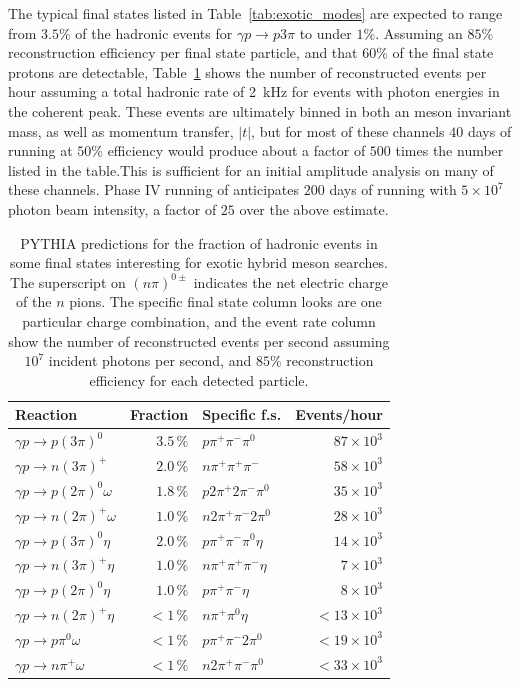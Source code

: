 The typical final states listed in Table~\ref{tab:exotic_modes} are expected to range from $3.5\%$ 
of the hadronic events for $\gamma p \rightarrow p 3\pi$ to under $1\%$. Assuming an $85\%$
reconstruction efficiency per final state particle, and that $60\%$ of the final state protons
are detectable, Table~\ref{tab:decay_rate_fractions} shows the number of reconstructed events per
hour assuming a total hadronic rate of 2~kHz for events with photon energies in the coherent
peak. These events are ultimately binned in both an meson invariant mass, as well as momentum
transfer, $|t|$, but for most of these channels $40$ days of running at $50\%$ efficiency would 
produce about a factor of $500$ times the number listed in the table.This is sufficient for
an initial amplitude analysis on many of these channels. Phase IV running of \GX{} anticipates 
$200$ days of running with $5\times  10^{7}$ photon beam intensity, a factor of $25$ over the
above estimate.

\begin{table}[h!]\centering
\caption[]{\label{tab:decay_rate_fractions}PYTHIA predictions for the fraction of hadronic events
in some final states interesting for exotic hybrid meson searches. The superscript on $(n\pi)^{0\pm}$
indicates the net electric charge of the $n$ pions. The specific final state column looks are one
particular charge combination, and the event rate column show the number of reconstructed events
per second assuming $10^{7}$ incident photons per second, and $85\%$ reconstruction efficiency
for each detected particle.}
\begin{tabular}{|l|r|l|r|}  \hline
Reaction & Fraction & Specific f.s. & Events/hour \\ \hline
$\gamma p \rightarrow p (3\pi)^{0}$ & $3.5\, \%$ & $p\pi^{+}\pi^{-}\pi^{0}$  & $87\times 10^{3}$ \\
$\gamma p \rightarrow n (3\pi)^{+}$ & $2.0\, \%$ & $n\pi^{+}\pi^{+}\pi^{-}$ & $58\times 10^{3}$ \\
$\gamma p \rightarrow p (2\pi)^{0}\omega$ & $1.8\, \%$ & $p2\pi^{+}2\pi^{-}\pi^{0}$ & $35\times 10^{3}$ \\
$\gamma p \rightarrow n (2\pi)^{+}\omega$ &  $1.0\, \%$ & $n2\pi^{+}\pi^{-}2\pi^{0}$ & $28\times 10^{3}$ \\
$\gamma p \rightarrow p (3\pi)^{0}\eta$ & $2.0\, \%$ & $p\pi^{+}\pi^{-}\pi^{0}\eta$ &  $14\times 10^{3}$ \\
$\gamma p \rightarrow n (3\pi)^{+}\eta$ &  $1.0\, \%$ & $n\pi^{+}\pi^{+}\pi^{-}\eta$ &  $7\times 10^{3}$ \\
$\gamma p \rightarrow p (2\pi)^{0}\eta$ & $1.0\, \%$ & $p\pi^{+}\pi^{-}\eta$ &  $8\times 10^{3}$ \\
$\gamma p \rightarrow n (2\pi)^{+}\eta$ &  $<1\, \%$ & $n\pi^{+}\pi^{0}\eta$ &  $<13\times 10^{3}$ \\
$\gamma p \rightarrow p \pi^{0}\omega$ & $<1\, \%$ & $p\pi^{+}\pi^{-}2\pi^{0}$ &  $<19\times 10^{3}$ \\
$\gamma p \rightarrow n \pi^{+}\omega$ &  $<1\, \%$ & $n2\pi^{+}\pi^{-}\pi^{0}$ &  $<33\times 10^{3}$ \\
\hline
\end{tabular} 
\end{table}


